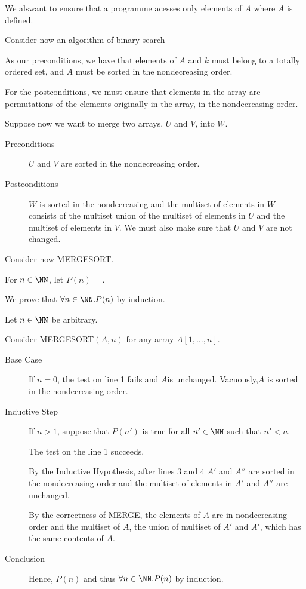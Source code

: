 \documentclass[11pt]{scrartcl}
\begin{document}
We alswant to ensure that a programme acesses only elements of $A$ where $A$ is defined.

Consider now an algorithm of binary search

As our preconditions, we have that elements of $A$ and $k$ must belong
to a totally ordered set, and $A$ must be sorted in the nondecreasing
order.

For the postconditions, we must ensure that elements in the array are
permutations of the elements originally in the array, in the
nondecreasing order.

Suppose now we want to merge two arrays, $U$ and $V$, into $W$.

\begin{description}

\item[Preconditions] \hfill

  $U$ and $V$ are sorted in the nondecreasing order.

\item[Postconditions] \hfill

  $W$ is sorted in the nondecreasing and the multiset of elements in
  $W$ consists of the multiset union of the multiset of elements in
  $U$ and the multiset of elements in $V$. We must also make sure that
  $U$ and $V$ are not changed.

\end{description}

Consider now MERGESORT.

For $n\in\NN$, let $P(n) =$.

We prove that $\forall n\in\NN. P(n)$ by induction.

Let $n\in\NN$ be arbitrary.

Consider MERGESORT$(A, n)$ for any array $A[1, \dots, n]$.

\begin{description}
\item[Base Case] \hfill

  If $n=0$, the test on line 1 fails and $A$is
  unchanged. Vacuously,$A$ is sorted in the nondecreasing order.

\item[Inductive Step] \hfill

  If $n>1$, suppose that $P(n')$ is true for all $n'\in\NN$ such that $n' < n$.

  The test on the line 1 succeeds.

  By the Inductive Hypothesis, after lines 3 and 4 $A'$ and $A''$ are sorted in the nondecreasing order and the multiset of elements in $A'$ and $A''$ are unchanged.

  By the correctness of MERGE, the elements of $A$ are in
  nondecreasing order and the multiset of $A$, the union of multiset
  of $A'$ and $A'$, which has the same contents of $A$. 
\item[Conclusion]
  \hfill

  Hence, $P(n)$ and thus $\forall n\in\NN. P(n)$ by induction.
\end{description}
\end{document}
